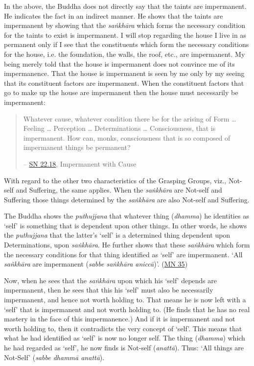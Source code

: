 In the above, the Buddha does not directly say that the taints are impermanent. He indicates the fact in an indirect manner. He shows that the taints are impermanent by showing that the \textit{saṅkhāra} which forms the necessary condition for the taints to exist is impermanent. I will stop regarding the house I live in as permanent only if I see that the constituents which form the necessary conditions for the house, i.e. the foundation, the walls, the roof, etc., are impermanent. My being merely told that the house is impermanent does not convince me of its impermanence. That the house is impermanent is seen by me only by my seeing that its constituent factors are impermanent. When the constituent factors that go to make up the house are impermanent then the house must necessarily be impermanent:

\begin{quote}
Whatever cause, whatever condition there be for the arising of Form \ldots\hspace{0pt} Feeling \ldots\hspace{0pt} Perception \ldots\hspace{0pt} Determinations \ldots\hspace{0pt} Consciousness, that is impermanent. How can, monks, consciousness that is so composed of impermanent things be permanent?

 -- \href{https://suttacentral.net/sn22.18/en/bodhi}{SN 22.18}, Impermanent with Cause
\end{quote}

With regard to the other two characteristics of the Grasping Groups, viz., Not-self and Suffering, the same applies. When the \textit{saṅkhāra} are Not-self and Suffering those things determined by the \textit{saṅkhāra} are also Not-self and Suffering.

The Buddha shows the \textit{puthujjana} that whatever thing (\textit{dhamma}) he identities as `self' is something that is dependent upon other things. In other words, he shows the \textit{puthujjana} that the latter's `self' is a determined thing dependent upon Determinations, upon \textit{saṅkhāra}. He further shows that these \textit{saṅkhāra} which form the necessary conditions for that thing identified as `self' are impermanent. `All \textit{sañkhāra} are impermanent (\textit{sabbe saṅkhāra aniccā})'. (\href{https://suttacentral.net/mn35/en/sujato}{MN 35})

Now, when he sees that the \textit{saṅkhāra} upon which his `self' depends are impermanent, then he sees that this his `self' must also be necessarily impermanent, and hence not worth holding to. That means he is now left with a `self' that is impermanent and not worth holding to. (He finds that he has no real mastery in the face of this impermanence.) And if it is impermanent and not worth holding to, then it contradicts the very concept of `self'. This means that what he had identified as `self' is now no longer self. The thing (\textit{dhamma}) which he had regarded as `self', he now finds is Not-self (\textit{anattā}). Thus: `All things are Not-Self' (\textit{sabbe dhammā anattā}).

